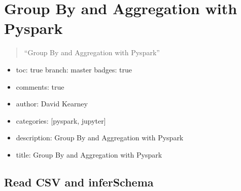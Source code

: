 \documentclass[letterpaper,10pt,english]{sphinxmanual}
\begin{document}
\chapter{Group By and Aggregation with Pyspark}
\label{\detokenize{2020-08-17-Pyspark-Group-By:group-by-and-aggregation-with-pyspark}}\label{\detokenize{2020-08-17-Pyspark-Group-By::doc}}\begin{quote}

“Group By and Aggregation with Pyspark”
\end{quote}
\begin{itemize}
\item {} 
toc: true\sphinxhyphen{} branch: master\sphinxhyphen{} badges: true

\item {} 
comments: true

\item {} 
author: David Kearney

\item {} 
categories: {[}pyspark, jupyter{]}

\item {} 
description: Group By and Aggregation with Pyspark

\item {} 
title: Group By and Aggregation with Pyspark

\end{itemize}


\section{Read CSV and inferSchema}
\label{\detokenize{2020-08-17-Pyspark-Group-By:read-csv-and-inferschema}}
\begin{sphinxVerbatim}[commandchars=\\\{\}]
   
    


  
    
\end{sphinxVerbatim}
\end{document}
